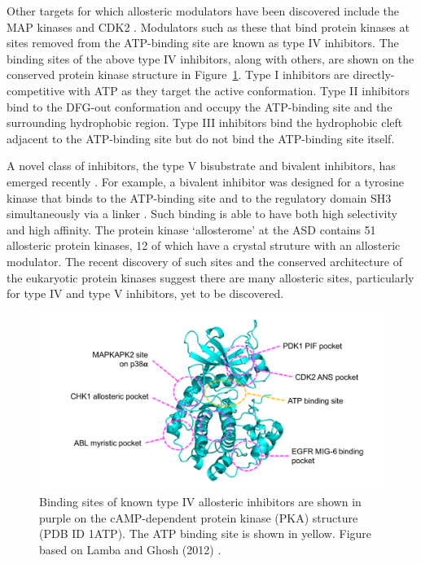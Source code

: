 Other targets for which allosteric modulators have been discovered include the MAP kinases \cite{Comess2011} and CDK2 \cite{Betzi2011}.
Modulators such as these that bind protein kinases at sites removed from the ATP-binding site are known as type IV inhibitors.
The binding sites of the above type IV inhibitors, along with others, are shown on the conserved protein kinase structure in Figure~\ref{fig:kinase_mods}.
Type I inhibitors are directly-competitive with ATP as they target the active conformation.
Type II inhibitors bind to the DFG-out conformation and occupy the ATP-binding site and the surrounding hydrophobic region.
Type III inhibitors bind the hydrophobic cleft adjacent to the ATP-binding site but do not bind the ATP-binding site itself.

A novel class of inhibitors, the type V bisubstrate and bivalent inhibitors, has emerged recently \cite{Lamba2012}.
For example, a bivalent inhibitor was designed for a tyrosine kinase that binds to the ATP-binding site and to the regulatory domain SH3 simultaneously via a linker \cite{Hill2009}.
Such binding is able to have both high selectivity and high affinity.
The protein kinase `allosterome' at the ASD contains 51 allosteric protein kinases, 12 of which have a crystal struture with an allosteric modulator.
The recent discovery of such sites and the conserved architecture of the eukaryotic protein kinases suggest there are many allosteric sites, particularly for type IV and type V inhibitors, yet to be discovered.


\begin{figure}
\centering

\includegraphics[width=\textwidth]{figures/kinase_mods/kinase_mods}

\caption[Binding sites of known type IV allosteric inhibitors of protein kinases]
{Binding sites of known type IV allosteric inhibitors are shown in purple on the cAMP-dependent protein kinase (PKA) structure (PDB ID 1ATP).
The ATP binding site is shown in yellow.
Figure based on Lamba and Ghosh (2012) \cite{Lamba2012}.}

\label{fig:kinase_mods}
\end{figure}


